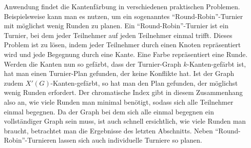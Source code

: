 \documentclass[a4paper,12pt,ngerman,chapterprefix=false,listof=totoc,bibliography=totoc]{scrreprt}
\begin{document}
{Anwendung findet die Kantenfärbung in verschiedenen praktischen Problemen. Beispielsweise kann man es nutzen, um ein sogenanntes "`Round-Robin"'-Turnier mit möglichst wenig Runden zu planen. Ein "`Round-Robin"'-Turnier ist ein Turnier, bei dem jeder Teilnehmer auf jeden Teilnehmer einmal trifft. Dieses Problem ist zu lösen, indem jeder Teilnehmer durch einen Knoten repräsentiert wird und jede Begegnung durch eine Kante. Eine Farbe repräsentiert eine Runde. Werden die Kanten nun so gefärbt, dass der Turnier-Graph \(k\)-Kanten-gefärbt ist, hat man einen Turnier-Plan gefunden, der keine Konflikte hat. Ist der Graph zudem \(X'(G)\)-Kanten-gefärbt, so hat man den Plan gefunden, der möglichst wenig Runden erfordert. Der chromatische Index gibt in diesem Zusammenhang also an, wie viele Runden man minimal benötigt, sodass sich alle Teilnehmer einmal begegnen. Da der Graph bei dem sich alle einmal begegnen ein vollständiger Graph sein muss, ist auch schnell ersichtlich, wie viele Runden man braucht, betrachtet man die Ergebnisse des letzten Abschnitts. Neben "`Round-Robin"'-Turnieren lassen sich auch individuelle Turniere so planen. \cite{gross_handbook_2004}
}
\end{document}
